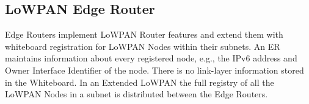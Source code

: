 \subsection{LoWPAN Edge Router}
Edge Routers implement LoWPAN Router features and extend them with whiteboard registration for LoWPAN Nodes within their subnets. An ER maintains information about every registered node, e.g., the IPv6 address and Owner Interface Identifier of the node. There is no link-layer information stored in the Whiteboard. In an Extended LoWPAN the full registry of all the LoWPAN Nodes in a subnet is distributed between the Edge Routers.


